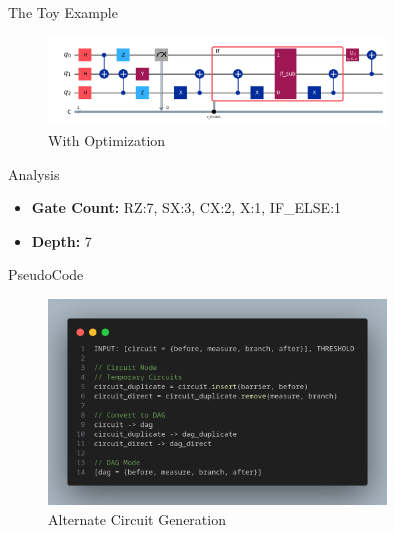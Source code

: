 \documentclass[10pt]{beamer}
\begin{document}
\begin{frame}{The Toy Example}
  \begin{figure}
    \centering
    \includegraphics[width=0.8\textwidth]{Images/toy2.png}
    \caption{With Optimization}
  \end{figure}

  \begin{block}{Analysis}
    \begin{itemize}
      \item \textbf{Gate Count:} RZ:7, SX:3, CX:2, X:1, IF\_ELSE:1
      \item \textbf{Depth:} 7
    \end{itemize}
  \end{block}
\end{frame}

\begin{frame}{PseudoCode}
  \begin{figure}
    \centering
    \includegraphics[width=0.8\textwidth]{Images/code_1.png}
    \caption{Alternate Circuit Generation}
  \end{figure}
\end{frame}
\end{document}

